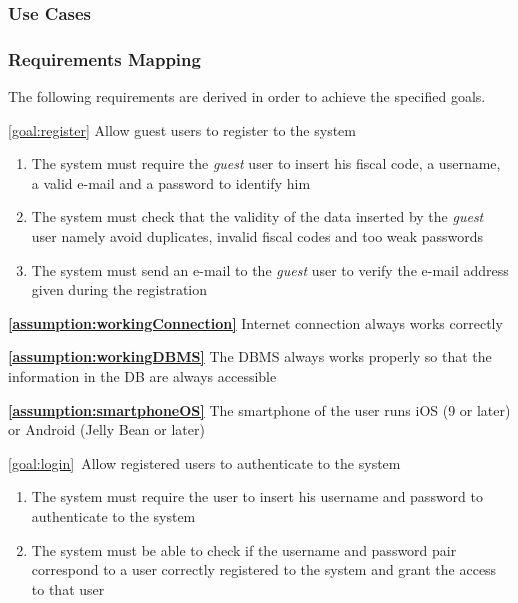 \clearpage

\subsubsection{Use Cases}

\clearpage

\subsubsection{Requirements Mapping}

	The following requirements are derived in order to achieve the specified goals.
	\begin{description}
		\item \ref{goal:register} Allow guest users to register to the system
			\begin{enumerate}[label=\textbf{R\arabic*}]
			
  				\item The system must require the \emph{guest} user to insert his fiscal code, a username, a valid e-mail and a password to identify him
  				
   				\item The system must check that the validity of the data inserted by the \emph{guest} user namely avoid duplicates, invalid fiscal codes and too weak passwords
   				
   				\item The system must send an e-mail to the \emph{guest} user to verify the e-mail address given during the registration
   
  			\end{enumerate}
  				
			\textbf{\ref{assumption:workingConnection}} Internet connection always works correctly
			
			\textbf{\ref{assumption:workingDBMS}} The DBMS always works properly so that the information in the DB are always accessible
			
			\textbf{\ref{assumption:smartphoneOS}} The smartphone of the user runs iOS (9 or later) or Android (Jelly Bean or later) \newline
			
  			
		\item \ref{goal:login}\ Allow registered users to authenticate to the system
			\begin{enumerate}[label=\textbf{R\arabic*}, resume]
  				\item The system must require the user to insert his username and password to authenticate to the system
   				\item The system must be able to check if the username and password pair correspond to a user correctly registered to the system and grant the access to that user 
			\end{enumerate}
			

\end{description}
